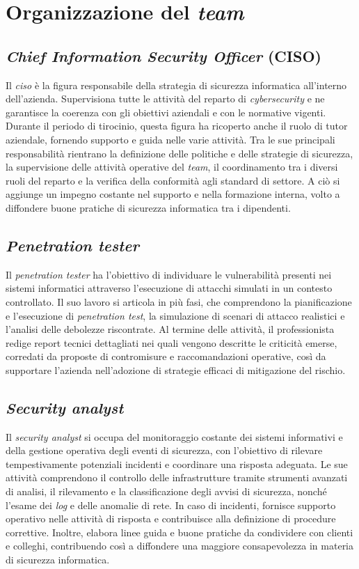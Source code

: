 \section{Organizzazione del \textit{team}}  

\subsection{\textit{Chief Information Security Officer} (CISO)}  
Il \textit{\gls{ciso}} è la figura responsabile della strategia di sicurezza informatica all'interno dell'azienda.
Supervisiona tutte le attività del reparto di \textit{cybersecurity} e ne garantisce la coerenza con gli obiettivi aziendali e con le normative vigenti.
Durante il periodo di tirocinio, questa figura ha ricoperto anche il ruolo di tutor aziendale, fornendo supporto e guida nelle varie attività.
Tra le sue principali responsabilità rientrano la definizione delle politiche e delle strategie di sicurezza, la supervisione delle attività operative del \textit{team}, il coordinamento tra i diversi ruoli del reparto e la verifica della conformità agli standard di settore.
A ciò si aggiunge un impegno costante nel supporto e nella formazione interna, volto a diffondere buone pratiche di sicurezza informatica tra i dipendenti.  

\subsection{\textit{Penetration tester}}  
Il \textit{penetration tester} ha l'obiettivo di individuare le vulnerabilità presenti nei sistemi informatici attraverso l'esecuzione di attacchi simulati in un contesto controllato.
Il suo lavoro si articola in più fasi, che comprendono la pianificazione e l'esecuzione di \textit{penetration test}, la simulazione di scenari di attacco realistici e l'analisi delle debolezze riscontrate.
Al termine delle attività, il professionista redige report tecnici dettagliati nei quali vengono descritte le criticità emerse, corredati da proposte di contromisure e raccomandazioni operative, così da supportare l'azienda nell'adozione di strategie efficaci di mitigazione del rischio.  

\subsection{\textit{Security analyst}}  
Il \textit{security analyst} si occupa del monitoraggio costante dei sistemi informativi e della gestione operativa degli eventi di sicurezza, con l'obiettivo di rilevare tempestivamente potenziali incidenti e coordinare una risposta adeguata.
Le sue attività comprendono il controllo delle infrastrutture tramite strumenti avanzati di analisi, il rilevamento e la classificazione degli avvisi di sicurezza, nonché l'esame dei \textit{log} e delle anomalie di rete.
In caso di incidenti, fornisce supporto operativo nelle attività di risposta e contribuisce alla definizione di procedure correttive.
Inoltre, elabora linee guida e buone pratiche da condividere con clienti e colleghi, contribuendo così a diffondere una maggiore consapevolezza in materia di sicurezza informatica.  

